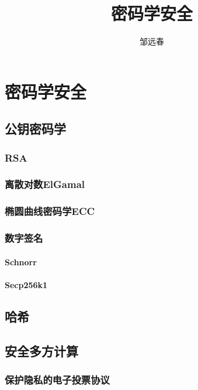 \documentclass[UTF8]{ctexart}
\title{密码学安全}
\author{邹远春}
\date{}
\begin{document}
\maketitle
\else
\chapter{密码学安全}
\fi
\section{公钥密码学}

\subsection{RSA}

\subsection{离散对数ElGamal}

\subsection{椭圆曲线密码学ECC}

\subsection{数字签名}

\subsubsection{Schnorr}

\subsubsection{Secp256k1}

\section{哈希}

\section{安全多方计算}

\subsection{保护隐私的电子投票协议}
\end{document}
